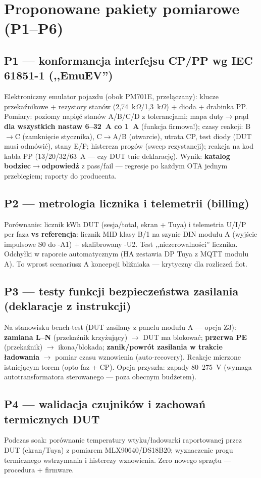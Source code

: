 \documentclass[11pt,a4paper]{article}
\newcommand{\ohm}{$\Omega$}
\begin{document}
\section{Proponowane pakiety pomiarowe (P1--P6)}
\subsection{P1 --- konformancja interfejsu CP/PP wg IEC 61851-1 (,,EmuEV'')}
Elektroniczny emulator pojazdu (obok PM701E, przełączany): klucze przekaźnikowe + rezystory stanów
(2,74~k\ohm{}/1,3~k\ohm) + dioda + drabinka PP. Pomiary: poziomy napięć stanów A/B/C/D z tolerancjami;
mapa duty$\to$prąd \textbf{dla wszystkich nastaw 6--32~A co 1~A} (funkcja firmowa!); czasy reakcji:
B$\to$C (zamknięcie stycznika), C$\to$A/B (otwarcie), utrata CP, test diody (DUT musi odmówić),
stany E/F; histereza progów (sweep rezystancji); reakcja na kod kabla PP (13/20/32/63~A --- czy DUT
tnie deklarację). Wynik: \textbf{katalog bodziec$\to$odpowiedź} z pass/fail --- regresje po każdym
OTA jednym przebiegiem; raporty do producenta.
\subsection{P2 --- metrologia licznika i telemetrii (billing)}
Porównanie: licznik kWh DUT (sesja/total, ekran + Tuya) i telemetria U/I/P per faza \textbf{vs
referencja}: licznik MID klasy B/1 na szynie DIN modułu A (wyjście impulsowe S0 do -A1) +
skalibrowany -U2. Test ,,niezerowalności'' licznika. Odchyłki w raporcie automatycznym (HA zestawia
DP Tuya z MQTT modułu A). To wprost scenariusz A koncepcji bliźniaka --- krytyczny dla rozliczeń flot.
\subsection{P3 --- testy funkcji bezpieczeństwa zasilania (deklaracje z instrukcji)}
Na stanowisku bench-test (DUT zasilany z panelu modułu A --- opcja Z3): \textbf{zamiana L--N}
(przekaźnik krzyżujący) $\to$ DUT ma blokować; \textbf{przerwa PE} (przekaźnik) $\to$ ikona/blokada;
\textbf{zanik/powrót zasilania w trakcie ładowania} $\to$ pomiar czasu wznowienia (auto-recovery).
Reakcje mierzone istniejącym torem (opto faz + CP). Opcja przyszła: zapady 80--275~V (wymaga
autotransformatora sterowanego --- poza obecnym budżetem).
\subsection{P4 --- walidacja czujników i zachowań termicznych DUT}
Podczas soak: porównanie temperatury wtyku/ładowarki raportowanej przez DUT (ekran/Tuya) z pomiarem
MLX90640/DS18B20; wyznaczenie progu termicznego wstrzymania i histerezy wznowienia. Zero nowego
sprzętu --- procedura + firmware.
\end{document}
